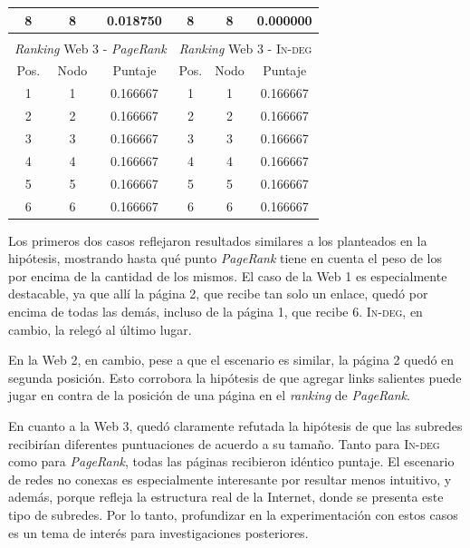 \begin{center}
\begin{tabular}{|c|c|c||c|c|c|}
                    8    & 8    & 0.018750   & 8    & 8    & 0.000000 \\ \hline
                    \multicolumn{6}{c}{} \\ \hline
                    \multicolumn{3}{|c||}{\emph{Ranking} Web 3 - \emph{PageRank}} & \multicolumn{3}{c|}{\emph{Ranking} Web 3 - \textsc{In-deg}} \\ \hline
                    Pos. & Nodo & Puntaje    & Pos. & Nodo & Puntaje  \\ \hline
                    1    & 1    & 0.166667   & 1    & 1    & 0.166667 \\
                    2    & 2    & 0.166667   & 2    & 2    & 0.166667 \\
                    3    & 3    & 0.166667   & 3    & 3    & 0.166667 \\
                    4    & 4    & 0.166667   & 4    & 4    & 0.166667 \\
                    5    & 5    & 0.166667   & 5    & 5    & 0.166667 \\
                    6    & 6    & 0.166667   & 6    & 6    & 0.166667 \\ \hline
                \end{tabular}
            \end{center}

            Los primeros dos casos reflejaron resultados similares a los planteados en la hipótesis, mostrando hasta qué punto \emph{PageRank} tiene en cuenta el peso de los  por encima de la cantidad de los mismos. El caso de la Web 1 es especialmente destacable, ya que allí la página 2, que recibe tan solo un enlace, quedó por encima de todas las demás, incluso de la página 1, que recibe 6. \textsc{In-deg}, en cambio, la relegó al último lugar.

            En la Web 2, en cambio, pese a que el escenario es similar, la página 2 quedó en segunda posición. Esto corrobora la hipótesis de que agregar links salientes puede jugar en contra de la posición de una página en el \emph{ranking} de \emph{PageRank}.

            En cuanto a la Web 3, quedó claramente refutada la hipótesis de que las subredes recibirían diferentes puntuaciones de acuerdo a su tamaño. Tanto para \textsc{In-deg} como para \emph{PageRank}, todas las páginas recibieron idéntico puntaje. El escenario de redes no conexas es especialmente interesante por resultar menos intuitivo, y además, porque refleja la estructura real de la Internet, donde se presenta este tipo de subredes. Por lo tanto, profundizar en la experimentación con estos casos es un tema de interés para investigaciones posteriores.

